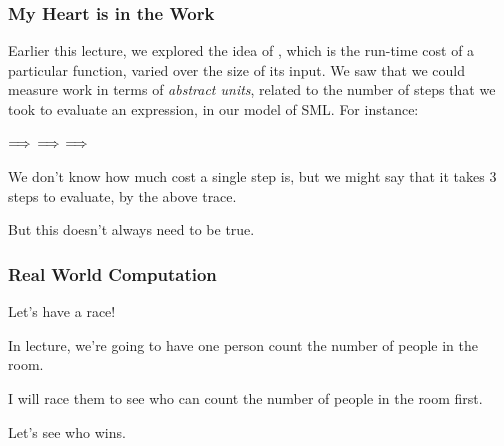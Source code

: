 \documentclass[aspectratio=169, handout]{beamer}
\begin{document}



\begin{frame}[fragile]
  \frametitle{My Heart is in the Work}

  Earlier this lecture, we explored the idea of , which is the run-time cost of a particular function,
  varied over the size of its input. We saw that we could measure work in terms of \textit{abstract units}, related
  to the number of steps that we took to evaluate an expression, in our model of SML. For instance:

  \pause
  \vspace{5pt}

   $\Longrightarrow$  $\Longrightarrow$  $\Longrightarrow$ 

  \pause
  \vspace{\fill}

  We don't know how much cost a single step is, but we might say that it takes 3 steps to evaluate,
  by the above trace.

  \pause
  \vspace{\fill}

  But this doesn't always need to be true.
\end{frame}

\begin{frame}[fragile]
  \frametitle{Real World Computation}

  Let's have a race!

  \pause
  \vspace{\fill}

  In lecture, we're going to have one person count the number of people in the room.

  \pause
  \vspace{\fill}

  I will race them to see who can count the number of people in the room first.

  \pause
  \vspace{\fill}

  Let's see who wins.

\end{frame}
\end{document}
